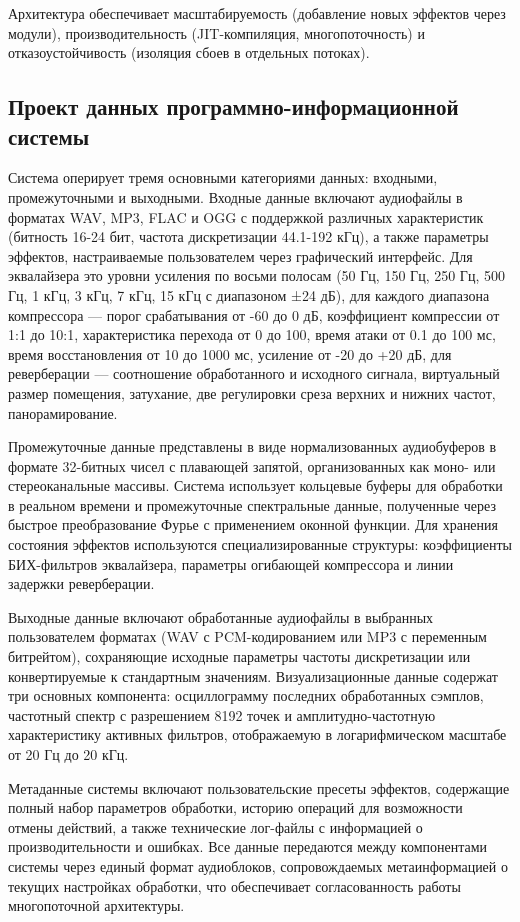 Архитектура обеспечивает масштабируемость (добавление новых эффектов через модули), производительность (JIT-компиляция, многопоточность) и отказоустойчивость (изоляция сбоев в отдельных потоках).

\subsection{Проект данных программно-информационной системы}

Система оперирует тремя основными категориями данных: входными, промежуточными и выходными. Входные данные включают аудиофайлы в форматах WAV, MP3, FLAC и OGG с поддержкой различных характеристик (битность 16-24 бит, частота дискретизации 44.1-192 кГц), а также параметры эффектов, настраиваемые пользователем через графический интерфейс. Для эквалайзера это уровни усиления по восьми полосам (50 Гц, 150 Гц, 250 Гц, 500 Гц, 1 кГц, 3 кГц, 7 кГц, 15 кГц с диапазоном ±24 дБ), для каждого диапазона компрессора — порог срабатывания от -60 до 0 дБ, коэффициент компрессии от 1:1 до 10:1, характеристика перехода от 0 до 100, время атаки от 0.1 до 100 мс, время восстановления от 10 до 1000 мс, усиление от -20 до +20 дБ, для реверберации — соотношение обработанного и исходного сигнала, виртуальный размер помещения, затухание, две регулировки среза верхних и нижних частот, панорамирование.

Промежуточные данные представлены в виде нормализованных аудиобуферов в формате 32-битных чисел с плавающей запятой, организованных как моно- или стереоканальные массивы. Система использует кольцевые буферы для обработки в реальном времени и промежуточные спектральные данные, полученные через быстрое преобразование Фурье с применением оконной функции. Для хранения состояния эффектов используются специализированные структуры: коэффициенты БИХ-фильтров эквалайзера, параметры огибающей компрессора и линии задержки реверберации.

Выходные данные включают обработанные аудиофайлы в выбранных пользователем форматах (WAV с PCM-кодированием или MP3 с переменным битрейтом), сохраняющие исходные параметры частоты дискретизации или конвертируемые к стандартным значениям. Визуализационные данные содержат три основных компонента: осциллограмму последних обработанных сэмплов, частотный спектр с разрешением 8192 точек и амплитудно-частотную характеристику активных фильтров, отображаемую в логарифмическом масштабе от 20 Гц до 20 кГц.

Метаданные системы включают пользовательские пресеты эффектов, содержащие полный набор параметров обработки, историю операций для возможности отмены действий, а также технические лог-файлы с информацией о производительности и ошибках. Все данные передаются между компонентами системы через единый формат аудиоблоков, сопровождаемых метаинформацией о текущих настройках обработки, что обеспечивает согласованность работы многопоточной архитектуры.

